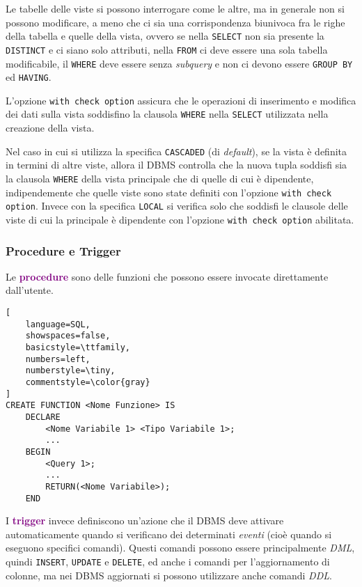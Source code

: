 Le tabelle delle viste si possono interrogare come le altre, ma in generale non si possono
modificare, a meno che ci sia una corrispondenza biunivoca fra le righe della tabella e quelle della vista,
ovvero se nella \verb|SELECT| non sia presente la \verb|DISTINCT| e ci siano solo attributi, nella \verb|FROM|
ci deve essere una sola tabella modificabile, il \verb|WHERE| deve essere senza \emph{subquery} e non ci devono essere
\verb|GROUP BY| ed \verb|HAVING|.

L'opzione \verb|with check option| assicura che le operazioni di inserimento e modifica
dei dati sulla vista soddisfino la clausola \verb|WHERE| nella \verb|SELECT| utilizzata nella
creazione della vista.

Nel caso in cui si utilizza la specifica \verb|CASCADED| (di \emph{default}), se la vista è definita
in termini di altre viste, allora il DBMS controlla che la nuova tupla soddisfi sia la clausola \verb|WHERE| della vista
principale che di quelle di cui è dipendente, indipendemente che quelle viste sono state definiti con l'opzione \verb|with check option|.
Invece con la specifica \verb|LOCAL| si verifica solo che soddisfi le clausole delle viste di cui la principale è dipendente con l'opzione
\verb|with check option| abilitata.

\subsubsection{Procedure e Trigger}

Le \textbf{\textcolor{purple}{procedure}} sono delle funzioni che possono
essere invocate direttamente dall'utente.
\begin{lstlisting}[
    language=SQL,
    showspaces=false,
    basicstyle=\ttfamily,
    numbers=left,
    numberstyle=\tiny,
    commentstyle=\color{gray}
]
CREATE FUNCTION <Nome Funzione> IS
    DECLARE
        <Nome Variabile 1> <Tipo Variabile 1>;
        ...
    BEGIN
        <Query 1>;
        ...
        RETURN(<Nome Variabile>);
    END
\end{lstlisting}

I \textbf{\textcolor{purple}{trigger}} invece definiscono un'azione che il
DBMS deve attivare automaticamente quando si verificano dei determinati \emph{eventi}
(cioè quando si eseguono specifici comandi). Questi comandi possono essere principalmente
\emph{DML}, quindi \verb|INSERT|, \verb|UPDATE| e \verb|DELETE|, ed anche i comandi per l'aggiornamento di
colonne, ma nei DBMS aggiornati si possono utilizzare anche comandi \emph{DDL}.

